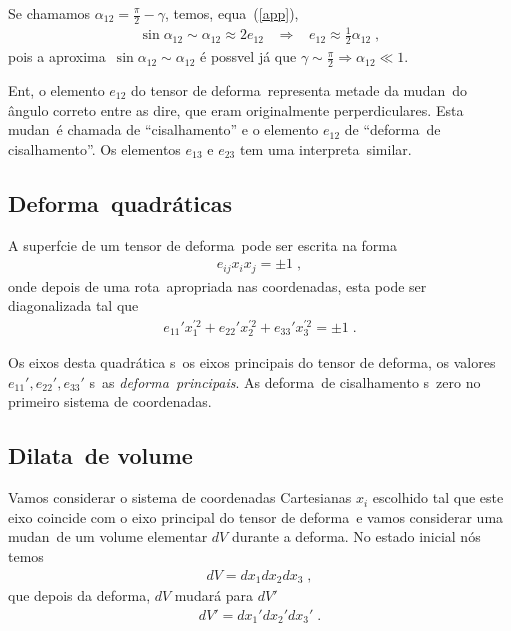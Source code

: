 \begin{itemize}
Se chamamos $\alpha_{12} = \frac{\pi}{2} - \gamma$, temos,
equa\cao\ (\ref{app}),
\begin{eqnarray}
\sin \alpha_{12} \sim \alpha_{12} \approx 2e_{12} \;\;\;\Rightarrow
\;\;\; e_{12} \approx \frac{1}{2} \alpha_{12} \; ,
\end{eqnarray}
pois a aproxima\cao\ $\sin \alpha_{12} \sim \alpha_{12}$ \'e
poss\ih vel j\'a que $\gamma \sim \frac{\pi}{2} \Rightarrow
\alpha_{12} \ll 1$.

Ent\ao, o elemento $e_{12}$ do tensor de deforma\cao\ representa
metade da mudan\ca\ do \^angulo correto entre as dire\coes, que
eram originalmente perperdiculares. Esta mudan\ca\ \'e chamada
de ``cisalhamento''  e o elemento $e_{12}$ de ``deforma\cao\ de
cisalhamento''. Os elementos $e_{13}$ e $e_{23}$ tem uma
interpreta\cao\ similar.

\end{itemize}

\subsection{Deforma\coes\ quadr\'aticas}

A superf\ih cie de um tensor de deforma\cao\ pode ser escrita
na forma
\begin{eqnarray}
e_{ij} x_i x_j = \pm 1 \; ,
\end{eqnarray}
onde depois de uma rota\cao\ apropriada nas coordenadas, esta
pode ser diagonalizada tal que
\begin{eqnarray}
e_{11}' x_1^{'2}+e_{22}' x_2^{'2}+e_{33}' x_3^{'2} = \pm 1 \; .
\end{eqnarray}

Os eixos desta quadr\'atica s\ao\ os eixos principais do tensor
de deforma\cao, os valores $e_{11}', e_{22}',  e_{33}'$ s\ao\ as
{\it deforma\coes\ principais}. As deforma\coes\ de cisalhamento
s\ao\ zero no primeiro sistema de coordenadas.


\subsection{Dilata\cao\ de volume}

Vamos considerar o sistema de coordenadas Cartesianas $x_i$
escolhido tal que este eixo coincide com o eixo principal do
tensor de deforma\cao\ e vamos considerar uma mudan\ca\ de
um volume elementar $dV$ durante a deforma\cao. No estado
inicial n\'os temos
\begin{eqnarray}
dV = dx_1 dx_2 dx_3 \; ,
\end{eqnarray}
que depois da deforma\cao, $dV$ mudar\'a para $dV'$
\begin{eqnarray}
dV' = dx_1' dx_2' dx_3' \; .
\end{eqnarray}

